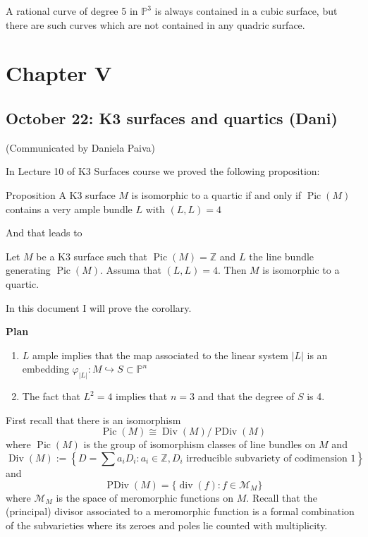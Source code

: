 \begin{manualexercise}{6.2}
	A rational curve of degree 5 in $\mathbb{P}^{3}$ is always contained in a cubic surface, but there  are such curves which are not contained in any quadric surface.  
\end{manualexercise}

\chapter{Chapter V}

\section{October 22: K3 surfaces and quartics (Dani)}

(Communicated by Daniela Paiva)

\vspace{1em}
In Lecture 10 of K3 Surfaces course we proved the following proposition:
\begin{thing5}{Proposition}\leavevmode
	A K3 surface $M$ is isomorphic to a quartic if and only if $\operatorname{Pic}(M)$ contains a very ample bundle $L$ with $(L,L)=4$
\end{thing5}

And that leads to

\begin{coro}\leavevmode
	Let $M$ be a K3 surface such that $\operatorname{Pic}(M) =\mathbb{Z}$ and $L$ the line bundle generating  $\operatorname{Pic}(M)$. Assuma that $(L,L)=4$. Then  $M$ is isomorphic to a quartic.
\end{coro}

In this document I will prove the corollary.

\vspace{1.5em}

\textbf{Plan}
\begin{enumerate}
	\item $L$ ample implies that the map associated to the linear system $|L|$ is an embedding $\varphi_{|L|}:M\hookrightarrow S\subset \mathbb{P}^{n}$

	\item The fact that $L^2=4$ implies that $n=3$ and that the degree of $S$ is 4.
\end{enumerate}

First recall that there is an isomorphism
\[\operatorname{Pic}(M) \cong \operatorname{Div}(M)/\operatorname{PDiv}(M)\]
where $\operatorname{Pic}(M)$ is the group of isomorphism classes of line bundles on $M$ and
\[\operatorname{Div}(M):= \left\{ D=\sum a_iD_i:a_i\in\mathbb{Z}, D_i\text{ irreducible subvariety of codimension 1}  \right\} \]
and
\[\operatorname{PDiv}(M)=\{\operatorname{div}(f):f\in \mathcal{M}_M\}\]
where $\mathcal{M}_M$ is the space of meromorphic functions on $M$. Recall that the (principal) divisor associated to a meromorphic function is a formal combination of the subvarieties where its zeroes and poles lie counted with multiplicity.

